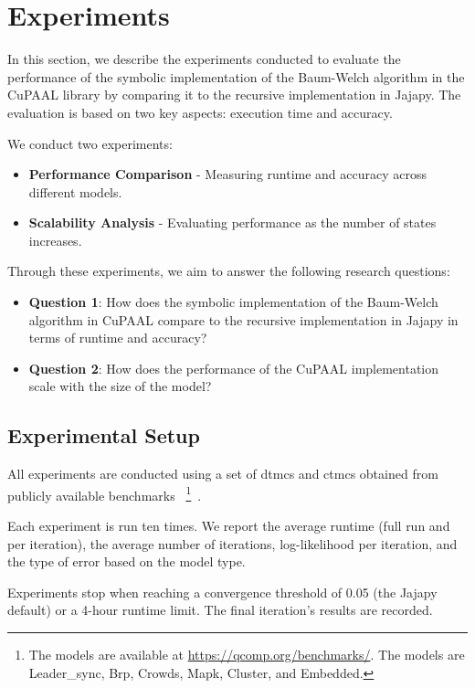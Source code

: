\section{Experiments}\label{sec:experiments}
In this section, we describe the experiments conducted to evaluate the performance of the symbolic implementation of the Baum-Welch algorithm in the CuPAAL library by comparing it to the recursive implementation in Jajapy.
The evaluation is based on two key aspects: execution time and accuracy.

We conduct two experiments:
\begin{itemize}
    \item \textbf{Performance Comparison} - Measuring runtime and accuracy across different models.
    \item \textbf{Scalability Analysis} - Evaluating performance as the number of states increases.
\end{itemize}

Through these experiments, we aim to answer the following research questions:
\begin{itemize}
    \item \textbf{Question 1}: How does the symbolic implementation of the Baum-Welch algorithm in CuPAAL compare to the recursive implementation in Jajapy in terms of runtime and accuracy?
    \item \textbf{Question 2}: How does the performance of the CuPAAL implementation scale with the size of the model?
\end{itemize}

\subsection{Experimental Setup}
All experiments are conducted using a set of \glspl{dtmc} and \glspl{ctmc} obtained from publicly available benchmarks~\cite{hartmanns2019quantitative}
\footnote{The models are available at \url{https://qcomp.org/benchmarks/}. The models are Leader\_sync, Brp, Crowds, Mapk, Cluster, and Embedded.}~\cite{hartmanns2019quantitative}.

Each experiment is run ten times.
We report the average runtime (full run and per iteration), the average number of iterations, log-likelihood per iteration, and the type of error based on the model type.

Experiments stop when reaching a convergence threshold of 0.05 (the Jajapy default) or a 4-hour runtime limit. The final iteration's results are recorded.

